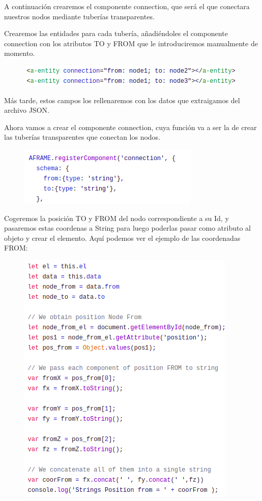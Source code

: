 \documentclass[a4paper, 12pt]{book}
\begin{document}
A continuación crearemos el componente connection, que será el que conectara nuestros nodos mediante tuberías transparentes.

Crearemos las entidades para cada tubería, añadiéndoles el componente connection con los atributos TO y FROM que le introduciremos manualmente de momento.

\begin{figure}[h]
\centering
    \includegraphics[scale=0.7]{img/entidad_connect.png}
\end{figure}

Más tarde, estos campos los rellenaremos con los datos que extraigamos del archivo JSON.

Ahora vamos a crear el componente connection, cuya función va a ser la de crear las tuberías transparentes que conectan los nodos.

\begin{figure}[h]
\centering
    \includegraphics[scale=0.7]{img/comp_conn.png}
\end{figure}

Cogeremos la posición TO y FROM del nodo correspondiente a su Id, y pasaremos estas coordenas a String para luego poderlas pasar como atributo al objeto y crear el elemento.
Aquí podemos ver el ejemplo de las coordenadas FROM:
\begin{figure}[h]
\centering
    \includegraphics[scale=0.6]{img/datos_from.png}
\end{figure}
\end{document}
